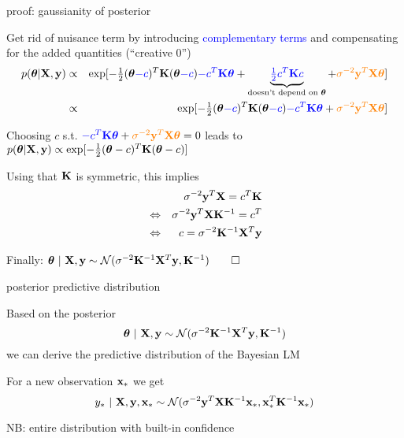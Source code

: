 \documentclass[11pt,compress,t,notes=noshow, xcolor=table]{beamer}
\begin{document}
\begin{framei}[fs=small]{proof: gaussianity of posterior}
\item Get rid of nuisance term by introducing \textcolor{blue}{complementary terms} and compensating for the added quantities  (``creative 0'')
\begin{eqnarray*}
	p(\bm{\theta} | \mathbf{X}, \mathbf{y}) &\propto&  \exp[-\tfrac{1}{2}(\bm{\theta} \textcolor{blue}{- c})^T\mathbf{K}  (\bm{\theta} \textcolor{blue}{- c}) \textcolor{blue}{- c^T \mathbf{K} \bm{\theta}} + \underbrace{\textcolor{blue}{\tfrac{1}{2}c^T\mathbf{K} c}}_{\text{doesn't depend on } \bm{\theta}} + \textcolor{orange}{\sigma^{-2} \mathbf{y}^T \mathbf{X} \bm{\theta}} ] \\
	&\propto& \exp [-\tfrac{1}{2}(\bm{\theta} \textcolor{blue}{- c})^T\mathbf{K}  (\bm{\theta} \textcolor{blue}{- c}) \textcolor{blue}{- c^T \mathbf{K} \bm{\theta}} + \textcolor{orange}{\sigma^{-2} \mathbf{y}^T \mathbf{X} \bm{\theta}} ]
\end{eqnarray*}
\item Choosing $c$  s.t. 
$\textcolor{blue}{- c^T \mathbf{K} \bm{\theta}} + \textcolor{orange}{\sigma^{-2} \mathbf{y}^T \mathbf{X} \bm{\theta}} = 0$ 
leads to 
$p(\bm{\theta} | \mathbf{X}, \mathbf{y}) \propto \exp [-\tfrac{1}{2}(\bm{\theta} - c)^T\mathbf{K}  (\bm{\theta} -c) ]$
\item Using that $\mathbf{K}$ is symmetric, this implies 
\begin{eqnarray*}
&& \sigma^{-2} \mathbf{y}^T \mathbf{X} = c^T\mathbf{K} \\
&\Leftrightarrow & \sigma^{-2} \mathbf{y}^T \mathbf{X} \mathbf{K}^{-1} = c^T \\
&\Leftrightarrow& c = \sigma^{-2} \mathbf{K}^{-1} \mathbf{X}^T \mathbf{y}
\end{eqnarray*}
\item Finally: $\bm{\theta} ~|~ \mathbf{X}, \mathbf{y} \sim  \mathcal{N}(\sigma^{-2}\mathbf{K}^{-1}\mathbf{X}^T\mathbf{y}, \mathbf{K}^{-1}) \qed$
\end{framei}

\begin{framei}[sep=L]{posterior predictive distribution}
\item Based on the posterior 
$$
\bm{\theta} ~|~ \mathbf{X}, \mathbf{y} \sim  \mathcal{N}(\sigma^{-2}\mathbf{K}^{-1}\mathbf{X}^T\mathbf{y}, \mathbf{K}^{-1})
$$
we can derive the predictive distribution of the Bayesian LM
\item For a new observation $\mathbf{x}_*$ we get
$$
y_* ~|~ \mathbf{X}, \mathbf{y}, \mathbf{x}_* \sim \mathcal{N}(\sigma^{-2}\mathbf{y}^T \mathbf{X} \mathbf{K}^{-1}\mathbf{x}_*, \mathbf{x}_*^T\mathbf{K}^{-1}\mathbf{x}_*)
$$
\item NB: entire distribution with built-in confidence
\end{framei}
\end{document}
